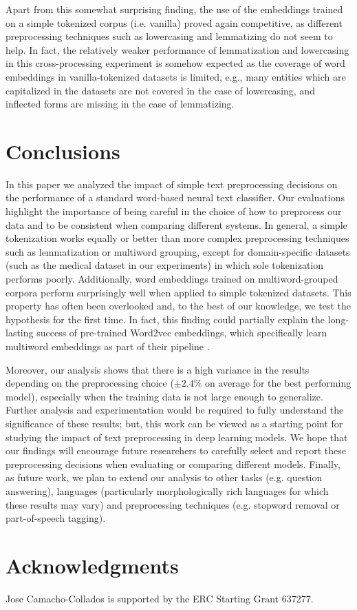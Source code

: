 \documentclass[11pt,a4paper]{article}
\begin{document}
Apart from this somewhat surprising finding, the use of the embeddings trained on a simple tokenized corpus (i.e. vanilla) proved again competitive, as different preprocessing techniques such as lowercasing and lemmatizing do not seem to help. In fact, the relatively weaker performance of lemmatization and lowercasing in this cross-processing experiment is somehow expected as the coverage of word embeddings in vanilla-tokenized datasets is limited, e.g., many entities which are capitalized in the datasets are not covered in the case of lowercasing, and inflected forms are missing in the case of lemmatizing.  






\section{Conclusions}

In this paper we analyzed the impact of simple text preprocessing decisions on the performance of a standard word-based neural text classifier. Our evaluations highlight the importance of being careful in the choice of how to preprocess our data and to be consistent when comparing different systems. In general, a simple tokenization works equally or better than more complex preprocessing techniques such as lemmatization or multiword grouping, except for domain-specific datasets (such as the medical dataset in our experiments) in which sole tokenization performs poorly. Additionally, word embeddings trained on multiword-grouped corpora perform surprisingly well when applied to simple tokenized datasets. This property has often been overlooked and, to the best of our knowledge, we test the hypothesis for the first time. 
In fact, this finding could partially explain the long-lasting success of pre-trained Word2vec embeddings, which specifically learn multiword embeddings as part of their pipeline \cite{mikolov2013distributed}. 

Moreover, our analysis shows that there is a high variance in the results depending on the preprocessing choice ($\pm 2.4\%$ on average for the best performing model), especially when the training data is not large enough to generalize. Further analysis and experimentation would be required to fully understand the significance of these results; but, this work can be viewed as a starting point for studying the impact of text preprocessing in deep learning models. We hope that our findings will encourage future researchers to carefully select and report these preprocessing decisions when evaluating or comparing different models. Finally, as future work, we plan to extend our analysis to other tasks (e.g. question answering), languages (particularly morphologically rich languages for which these results may vary) and preprocessing techniques (e.g. stopword removal or part-of-speech tagging). 





\section*{Acknowledgments}

Jose Camacho-Collados is supported by the ERC Starting Grant 637277.










\appendix
\end{document}
